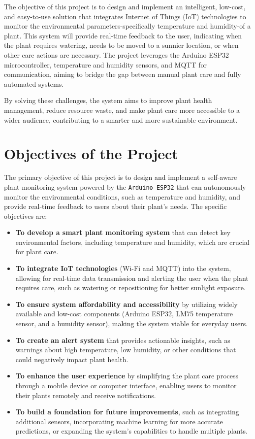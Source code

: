 \documentclass[12pt,a4paper,oneside,english]{book}
\begin{document}
The objective of this project is to design and implement an intelligent, low-cost, and easy-to-use solution that integrates Internet of Things (IoT) technologies to monitor the environmental parameters-specifically temperature and humidity-of a plant. This system will provide real-time feedback to the user, indicating when the plant requires watering, needs to be moved to a sunnier location, or when other care actions are necessary. The project leverages the Arduino ESP32 microcontroller, temperature and humidity sensors, and MQTT for communication, aiming to bridge the gap between manual plant care and fully automated systems.

By solving these challenges, the system aims to improve plant health management, reduce resource waste, and make plant care more accessible to a wider audience, contributing to a smarter and more sustainable environment.


\section{Objectives of the Project}
The primary objective of this project is to design and implement a self-aware plant monitoring system powered by the \texttt{Arduino ESP32} that can autonomously monitor the environmental conditions, such as temperature and humidity, and provide real-time feedback to users about their plant's needs. The specific objectives are:

\begin{itemize}
    \item \textbf{To develop a smart plant monitoring system} that can detect key environmental factors, including temperature and humidity, which are crucial for plant care.
    \item \textbf{To integrate IoT technologies} (Wi-Fi and MQTT) into the system, allowing for real-time data transmission and alerting the user when the plant requires care, such as watering or repositioning for better sunlight exposure.
    \item \textbf{To ensure system affordability and accessibility} by utilizing widely available and low-cost components (Arduino ESP32, LM75 temperature sensor, and a humidity sensor), making the system viable for everyday users.
    \item \textbf{To create an alert system} that provides actionable insights, such as warnings about high temperature, low humidity, or other conditions that could negatively impact plant health.
    \item \textbf{To enhance the user experience} by simplifying the plant care process through a mobile device or computer interface, enabling users to monitor their plants remotely and receive notifications.
    \item \textbf{To build a foundation for future improvements}, such as integrating additional sensors, incorporating machine learning for more accurate predictions, or expanding the system's capabilities to handle multiple plants.
\end{itemize}
\end{document}
